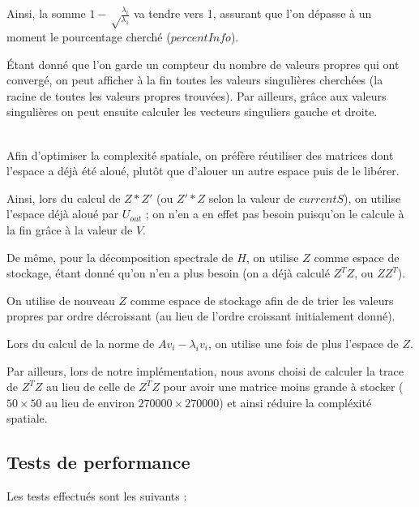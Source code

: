 \documentclass[fleqn]{article}
\begin{document}
Ainsi, la somme $\displaystyle 1 - \sqrt \frac{\lambda_i}{\lambda_1}$ va tendre vers 1, assurant que l'on dépasse à un moment le pourcentage cherché ($percentInfo$).

\'Etant donné que l'on garde un compteur du nombre de valeurs propres qui ont convergé, on peut afficher à la fin toutes les valeurs singulières cherchées (la racine de toutes les valeurs propres trouvées).
Par ailleurs, grâce aux valeurs singulières on peut ensuite calculer les vecteurs singuliers gauche et droite.

~\\

Afin d'optimiser la complexité spatiale, on préfère réutiliser des matrices dont l'espace a déjà été aloué, plutôt que d'alouer un autre espace puis de le libérer. 

Ainsi, lors du calcul de $Z*Z'$ (ou $Z'*Z$ selon la valeur de $currentS$), on utilise l'espace déjà aloué par $U_{out}$ ; on n'en a en effet pas besoin puisqu'on le calcule à la fin grâce à la valeur de $V$.

De même, pour la décomposition spectrale de $H$, on utilise $Z$ comme espace de stockage, étant donné qu'on n'en a plus besoin (on a déjà calculé $Z^TZ$, ou $ZZ^T$). 

On utilise de nouveau $Z$ comme espace de stockage afin de de trier les valeurs propres par ordre décroissant (au lieu de l'ordre croissant initialement donné). 

Lors du calcul de la norme de $Av_i - \lambda_iv_i$, on utilise une fois de plus l'espace de $Z$.

Par ailleurs, lors de notre implémentation, nous avons choisi de calculer la trace de $Z^TZ$ au lieu de celle de $Z^TZ$ pour avoir une matrice moins grande à stocker ($50\times50$ au lieu de environ $ 270 000 \times 270 000$) et ainsi réduire la compléxité spatiale.




\pagebreak
\subsection{Tests de performance}

Les tests effectués sont les suivants : 
\end{document}
